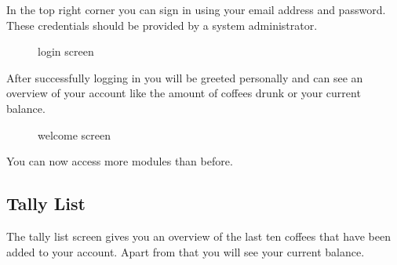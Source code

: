 In the top right corner you can sign in using your email address and
password. These credentials should be provided by a system
administrator.

\begin{figure}[htbp]
\centering
{}
\caption{login screen}
\end{figure}

After successfully logging in you will be greeted personally and can see
an overview of your account like the amount of coffees drunk or your
current balance.

\begin{figure}[htbp]
\centering
{}
\caption{welcome screen}
\end{figure}

You can now access more modules than before.

\subsection{Tally List}\label{tally-list-1}

The tally list screen gives you an overview of the last ten coffees that
have been added to your account. Apart from that you will see your
current balance.

